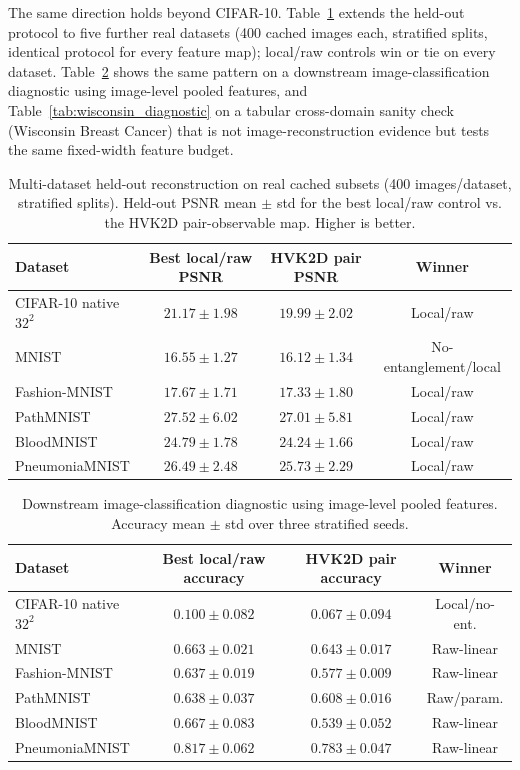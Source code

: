 \documentclass[journal]{IEEEtran}
\begin{document}
The same direction holds beyond CIFAR-10. Table~\ref{tab:multi_dataset_reconstruction} extends the held-out protocol to five further real datasets (400 cached images each, stratified splits, identical protocol for every feature map); local/raw controls win or tie on every dataset. Table~\ref{tab:multi_dataset_classification} shows the same pattern on a downstream image-classification diagnostic using image-level pooled features, and Table~\ref{tab:wisconsin_diagnostic} on a tabular cross-domain sanity check (Wisconsin Breast Cancer) that is not image-reconstruction evidence but tests the same fixed-width feature budget.

\begin{table}[t]
\centering
\caption{Multi-dataset held-out reconstruction on real cached subsets (400 images/dataset, stratified splits). Held-out PSNR mean $\pm$ std for the best local/raw control vs. the HVK2D pair-observable map. Higher is better.}
\label{tab:multi_dataset_reconstruction}
\scriptsize
\begin{tabular}{lccc}
\toprule
Dataset & Best local/raw PSNR & HVK2D pair PSNR & Winner \\
\midrule
CIFAR-10 native $32^2$ & $21.17{\pm}1.98$ & $19.99{\pm}2.02$ & Local/raw \\
MNIST & $16.55{\pm}1.27$ & $16.12{\pm}1.34$ & No-entanglement/local \\
Fashion-MNIST & $17.67{\pm}1.71$ & $17.33{\pm}1.80$ & Local/raw \\
PathMNIST & $27.52{\pm}6.02$ & $27.01{\pm}5.81$ & Local/raw \\
BloodMNIST & $24.79{\pm}1.78$ & $24.24{\pm}1.66$ & Local/raw \\
PneumoniaMNIST & $26.49{\pm}2.48$ & $25.73{\pm}2.29$ & Local/raw \\
\bottomrule
\end{tabular}
\end{table}

\begin{table}[t]
\centering
\caption{Downstream image-classification diagnostic using image-level pooled features. Accuracy mean $\pm$ std over three stratified seeds.}
\label{tab:multi_dataset_classification}
\scriptsize
\begin{tabular}{lccc}
\toprule
Dataset & Best local/raw accuracy & HVK2D pair accuracy & Winner \\
\midrule
CIFAR-10 native $32^2$ & $0.100{\pm}0.082$ & $0.067{\pm}0.094$ & Local/no-ent. \\
MNIST & $0.663{\pm}0.021$ & $0.643{\pm}0.017$ & Raw-linear \\
Fashion-MNIST & $0.637{\pm}0.019$ & $0.577{\pm}0.009$ & Raw-linear \\
PathMNIST & $0.638{\pm}0.037$ & $0.608{\pm}0.016$ & Raw/param. \\
BloodMNIST & $0.667{\pm}0.083$ & $0.539{\pm}0.052$ & Raw-linear \\
PneumoniaMNIST & $0.817{\pm}0.062$ & $0.783{\pm}0.047$ & Raw-linear \\
\bottomrule
\end{tabular}
\end{table}
\end{document}
